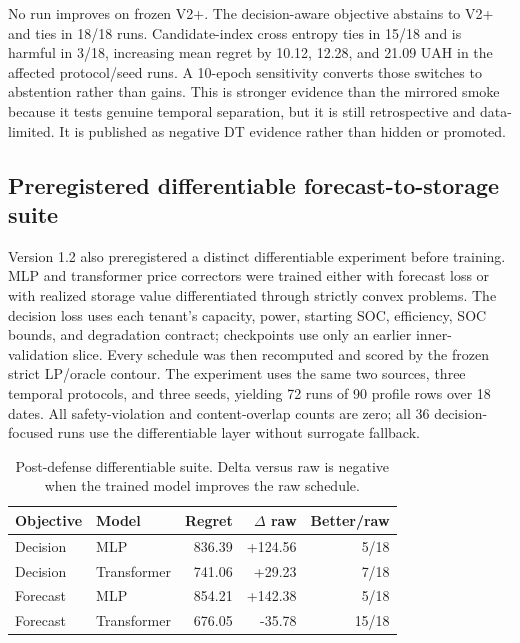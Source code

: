 No run improves on frozen V2+. The decision-aware objective abstains to V2+ and ties in 18/18 runs. Candidate-index cross entropy ties in 15/18 and is harmful in 3/18, increasing mean regret by 10.12, 12.28, and 21.09 UAH in the affected protocol/seed runs. A 10-epoch sensitivity converts those switches to abstention rather than gains. This is stronger evidence than the mirrored smoke because it tests genuine temporal separation, but it is still retrospective and data-limited. It is published as negative DT evidence rather than hidden or promoted.

\subsection{Preregistered differentiable forecast-to-storage suite}

Version 1.2 also preregistered a distinct differentiable experiment before training. MLP and transformer price correctors were trained either with forecast loss or with realized storage value differentiated through strictly convex  problems. The decision loss uses each tenant's capacity, power, starting SOC, efficiency, SOC bounds, and degradation contract; checkpoints use only an earlier inner-validation slice. Every schedule was then recomputed and scored by the frozen strict LP/oracle contour. The experiment uses the same two sources, three temporal protocols, and three seeds, yielding 72 runs of 90 profile rows over 18 dates. All safety-violation and content-overlap counts are zero; all 36 decision-focused runs use the differentiable layer without surrogate fallback.

\begin{table}[t]
\centering
\caption{Post-defense differentiable suite. Delta versus raw is negative when the trained model improves the raw schedule.}
\label{tab:dfl-v12}
\small
\begin{tabular}{llrrr}
\toprule
Objective & Model & Regret & $\Delta$ raw & Better/raw \\
\midrule
Decision & MLP & 836.39 & +124.56 & 5/18 \\
Decision & Transformer & 741.06 & +29.23 & 7/18 \\
Forecast & MLP & 854.21 & +142.38 & 5/18 \\
Forecast & Transformer & 676.05 & -35.78 & 15/18 \\
\bottomrule
\end{tabular}
\end{table}

